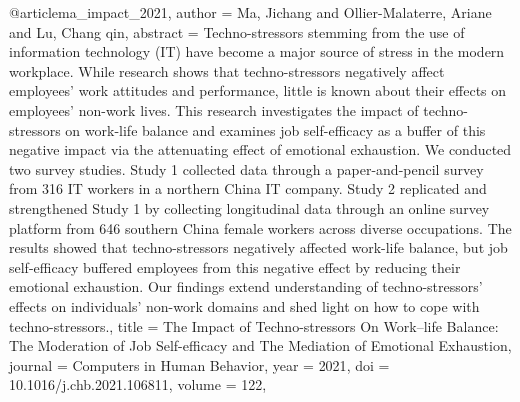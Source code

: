@article{ma_impact_2021,
  author = {Ma, Jichang and Ollier-Malaterre, Ariane and Lu, Chang qin},
  abstract = {Techno-stressors stemming from the use of information technology (IT) have become a major source of stress in the modern workplace. While research shows that techno-stressors negatively affect employees' work attitudes and performance, little is known about their effects on employees' non-work lives. This research investigates the impact of techno-stressors on work-life balance and examines job self-efficacy as a buffer of this negative impact via the attenuating effect of emotional exhaustion. We conducted two survey studies. Study 1 collected data through a paper-and-pencil survey from 316 IT workers in a northern China IT company. Study 2 replicated and strengthened Study 1 by collecting longitudinal data through an online survey platform from 646 southern China female workers across diverse occupations. The results showed that techno-stressors negatively affected work-life balance, but job self-efficacy buffered employees from this negative effect by reducing their emotional exhaustion. Our findings extend understanding of techno-stressors’ effects on individuals’ non-work domains and shed light on how to cope with techno-stressors.},
  title = {{The} {Impact} {of} {Techno-stressors} {On} {Work–life} {Balance}: {The} {Moderation} {of} {Job} {Self-efficacy} {and} {The} {Mediation} {of} {Emotional} {Exhaustion}},
  journal = {Computers in Human Behavior},
  year = {2021},
  doi = {10.1016/j.chb.2021.106811},
  volume = {122},
}

